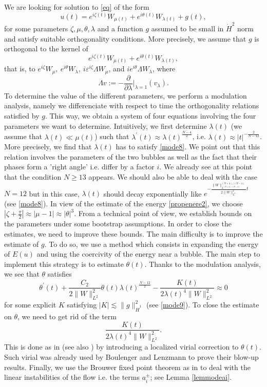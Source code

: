 \documentclass[a4paper,two-side,10pt]{amsart}
\numberwithin{equation}{section}
\newcommand{\e}{\varepsilon}
\begin{document}
We are looking for solution to \eqref{eq} of the form
$$u(t)= e^{i\zeta (t)}W_{\mu (t)}+ e^{i\theta (t)} W_{\lambda (t)} +g(t) ,$$
for some parameters $\zeta ,\mu ,\theta,\lambda$ and a function $g$ assumed to be small in $\dot{H}^2$ norm and satisfy suitable orthogonality conditions.  More precisely, we assume that $g$ is orthogonal to the kernel of 
\[
e^{i\zeta (t)}W_{\mu (t)}+ e^{i\theta (t)} W_{\lambda (t)},
\] 
that is, to $e^{i\zeta}W_\mu ,\ e^{i\theta }W_\lambda ,\ i\e^{i\zeta} \Lambda W_\mu$, and $ie^{i\theta} \Lambda W_\lambda$, where 
\[
\Lambda v:= -\dfrac{\partial}{\partial\lambda}\Big|_{\lambda=1} (v_\lambda).
\] 
To determine the value of the different parameters, we perform a modulation analysis, namely we differenciate with respect to time the orthogonality relations satisfied by $g$. This way, we obtain a system of four equations involving the four parameters we want to determine. Intuitively, we first determine $\lambda (t)$ (we assume that $\lambda (t) \ll \mu (t)$) such that $\lambda^\prime (t) \approx \lambda (t)^{\frac{N-4}{2}}$, i.e. $\lambda (t)\approx |t|^{-\frac{2}{N-12}} $. More precisely, we find that $\lambda(t)$ has to satisfy \eqref{mode8}. We point out that this relation involves the parameters of the two bubbles as well as the fact that their phases form a 'right angle' i.e. differ by a factor $i$. We already see at this point that the condition $N\geq 13$ appears. We should also be able to deal with the case $N=12$ but in this case, $\lambda(t)$ should decay exponentially like $e^{-\frac{\|W\|_{L^{(N+4)/(N-4)}}^{(N+4)/(N-4)}}{2\|W\|_{L^2}^2}t}$ (see \eqref{mode8}). In view of the estimate of the energy \eqref{propenere2}, we choose $|\zeta +\frac{\pi}{2}| \approx |\mu -1|\approx |\theta|^3$. From a technical point of view, we establish bounds on the parameters under some bootstrap assumptions. In order to close the estimates, we need to improve these bounds. The main difficulty is to improve the estimate of $g$. To do so, we use a method which consists in expanding the energy of $E(u)$ and using the coercivity of the energy near a bubble. The main step to implement this strategy is to estimate $\theta (t)$. Thanks to the modulation analysis, we see that $\theta$ satisfies 
\[
\theta^\prime (t) + \frac{C_2}{2\|W\|_{L^2}^2} \theta (t)  \lambda (t)^{\frac{N-12}{2}} - \dfrac{K(t)}{2 \lambda(t)^4 \|W\|_{L^2}^2} \approx 0 
\] 
for some explicit $K$ satisfying $|K|\lesssim \|g\|_{\dot{H}^1}^2$ (see \eqref{mode9}). To close the estimate on $\theta$, we need to get rid of the term 
\[
\dfrac{K(t)}{2 \lambda(t)^4 \|W\|_{L^2}^2}.
\]
 This is done as in \cite{JJ} (see also \cite{raphael2011existence}) by introducing a localized virial correction to $\theta (t)$. Such virial was already used by Boulenger and Lenzmann to prove their blow-up results. Finally, we use the Brouwer fixed point theorem as in \cite{CMM} to deal with the linear instabilities of the flow i.e. the terms $a_i^\pm$; see Lemma \ref{lemmodeai}. 
\end{document}

